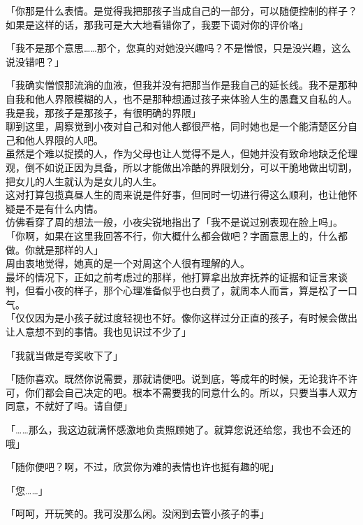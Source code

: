 「你那是什么表情。是觉得我把那孩子当成自己的一部分，可以随便控制的样子？如果是这样的话，那我可是大大地看错你了，我要下调对你的评价咯」

「我不是那个意思……那个，您真的对她没兴趣吗？不是憎恨，只是没兴趣，这么说没错吧？」

「我确实憎恨那流淌的血液，但我并没有把那当作是我自己的延长线。我不是那种自我和他人界限模糊的人，也不是那种想通过孩子来体验人生的愚蠢又自私的人。我是我，那孩子是那孩子，有很明确的界限」\\

聊到这里，周察觉到小夜对自己和对他人都很严格，同时她也是一个能清楚区分自己和他人界限的人吧。\\

虽然是个难以捉摸的人，作为父母也让人觉得不是人，但她并没有致命地缺乏伦理观，倒不如说正因为具备，所以才能做出冷酷的界限划分，可以干脆地做出切割，把女儿的人生就认为是女儿的人生。\\

这对打算包揽真昼人生的周来说是件好事，但同时一切进行得这么顺利，也让他怀疑是不是有什么内情。\\

仿佛看穿了周的想法一般，小夜尖锐地指出了「我不是说过别表现在脸上吗」。\\

「你啊，如果在这里我回答不行，你大概什么都会做吧？字面意思上的，什么都做。你就是那样的人」\\

周由衷地觉得，她真的是一个对周这个人很有理解的人。\\

最坏的情况下，正如之前考虑过的那样，他打算拿出放弃抚养的证据和证言来谈判，但看小夜的样子，那个心理准备似乎也白费了，就周本人而言，算是松了一口气。\\

「仅仅因为是小孩子就过度轻视也不好。像你这样过分正直的孩子，有时候会做出让人意想不到的事情。我也见识过不少了」

「我就当做是夸奖收下了」

「随你喜欢。既然你说需要，那就请便吧。说到底，等成年的时候，无论我许不许可，你们都会自己决定的吧。根本不需要我的同意什么的。所以，只要当事人双方同意，不就好了吗。请自便」

「……那么，我这边就满怀感激地负责照顾她了。就算您说还给您，我也不会还的哦」

「随你便吧？啊，不过，欣赏你为难的表情也许也挺有趣的呢」

「您……」

「呵呵，开玩笑的。我可没那么闲。没闲到去管小孩子的事」


